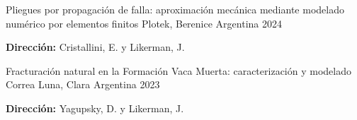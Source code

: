 

\begin{cventries}

\cventry
    {Pliegues por propagación de falla: aproximación mecánica mediante modelado numérico por elementos finitos} %
    {Plotek, Berenice} %
    {Argentina} %
    {2024} %
    {
      \begin{cvitems} %
        \item {\textbf{Dirección:} Cristallini, E. y Likerman, J.}
      \end{cvitems}
    }
\end{cventries}


\begin{cventries}

  \cventry
    {Fracturación natural en la Formación Vaca Muerta: caracterización y modelado} %
    {Correa Luna, Clara} %
    {Argentina} %
    {2023} %
    {
      \begin{cvitems} %
        \item {\textbf{Dirección:} Yagupsky, D. y Likerman, J.}
      \end{cvitems}
    }
\end{cventries}

